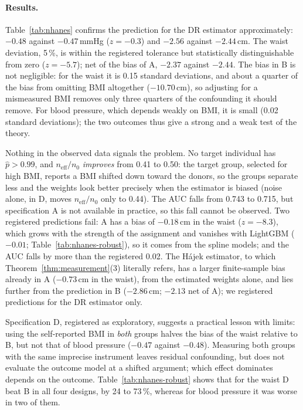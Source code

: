 \documentclass[twoside,11pt]{article}
\newcommand{\neff}{n_{\mathrm{eff}}}
\theoremstyle{plain}
\theoremstyle{definition}
\begin{document}
\paragraph{Results.} Table~\ref{tab:nhanes} confirms the prediction for the DR estimator approximately: $-0.48$ against $-0.47$\,mmHg ($z=-0.3$) and $-2.56$ against $-2.44$\,cm. The waist deviation, 5\,\%, is within the registered tolerance but statistically distinguishable from zero ($z=-5.7$); net of the bias of A, $-2.37$ against $-2.44$. The bias in B is not negligible: for the waist it is 0.15 standard deviations, and about a quarter of the bias from omitting BMI altogether ($-10.70$\,cm), so adjusting for a mismeasured BMI removes only three quarters of the confounding it should remove. For blood pressure, which depends weakly on BMI, it is small (0.02 standard deviations); the two outcomes thus give a strong and a weak test of the theory.

Nothing in the observed data signals the problem. No target individual has $\hat p>0.99$, and $\neff/n_0$ \emph{improves} from 0.41 to 0.50: the target group, selected for high BMI, reports a BMI shifted down toward the donors, so the groups separate less and the weights look better precisely when the estimator is biased (noise alone, in D, moves $\neff/n_0$ only to 0.44). The AUC falls from 0.743 to 0.715, but specification A is not available in practice, so this fall cannot be observed. Two registered predictions fail: A has a bias of $-0.18$\,cm in the waist ($z=-8.3$), which grows with the strength of the assignment and vanishes with LightGBM ($-0.01$; Table~\ref{tab:nhanes-robust}), so it comes from the spline models; and the AUC falls by more than the registered 0.02. The H\'ajek estimator, to which Theorem~\ref{thm:measurement}(3) literally refers, has a larger finite-sample bias already in A ($-0.73$\,cm in the waist), from the estimated weights alone, and lies further from the prediction in B ($-2.86$\,cm; $-2.13$ net of A); we registered predictions for the DR estimator only.

Specification D, registered as exploratory, suggests a practical lesson with limits: using the self-reported BMI in \emph{both} groups halves the bias of the waist relative to B, but not that of blood pressure ($-0.47$ against $-0.48$). Measuring both groups with the same imprecise instrument leaves residual confounding, but does not evaluate the outcome model at a shifted argument; which effect dominates depends on the outcome. Table~\ref{tab:nhanes-robust} shows that for the waist D beat B in all four designs, by 24 to 73\,\%, whereas for blood pressure it was worse in two of them.
\end{document}
